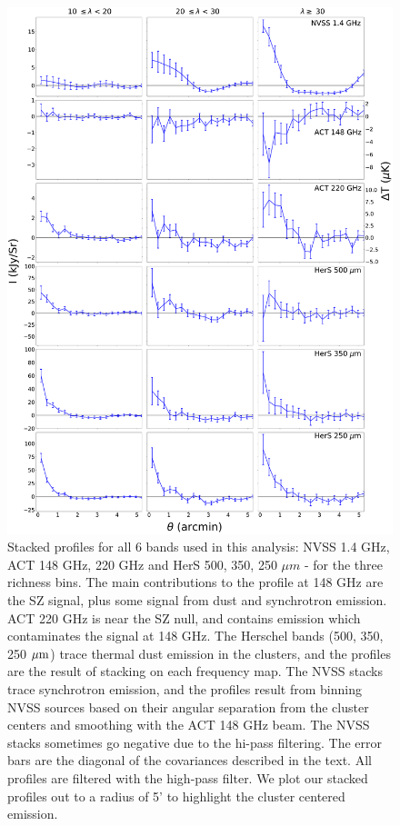 \documentclass[a4paper,fleqn,usenatbib]{mnras}
\begin{document}
\begin{figure}
  \centering
  \includegraphics[height=0.9 \textheight]{5panel_rawprofs_all_stacks_all_rbin.pdf}

\caption{Stacked profiles for all 6 bands used in this analysis: NVSS 1.4 GHz, ACT 148 GHz, 220 GHz and HerS 500, 350, 250 $\mu m$ - for the three richness bins. 
The main contributions to the profile at 148 GHz are the SZ signal, plus some signal from dust and synchrotron emission. 
ACT 220 GHz is near the SZ null, and contains emission which contaminates the signal at 148 GHz. 
The Herschel bands (500, 350, 250 $\rm \mu m$) trace thermal dust emission in the clusters, and the profiles are the result of stacking on each frequency map. 
The NVSS stacks trace synchrotron emission, and the profiles result from binning NVSS sources based on their angular separation from the cluster centers and smoothing with the ACT 148 GHz beam. 
The NVSS stacks sometimes go negative due to the hi-pass filtering.
The error bars are the diagonal of the covariances described in the text.
All profiles are filtered with the high-pass filter.
We plot our stacked profiles out to a radius of 5' to highlight the cluster centered emission.}  
  \label{fig:rawstacks}
\end{figure}
\end{document}
